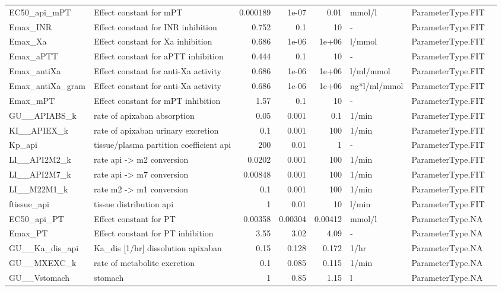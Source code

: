 \begin{tabular}{llrrrlll}
EC50\_api\_mPT & Effect constant for mPT & 0.000189 & 1e-07 & 0.01 & mmol/l & ParameterType.FIT &  \\
Emax\_INR & Effect constant for INR inhibition & 0.752 & 0.1 & 10 & - & ParameterType.FIT &  \\
Emax\_Xa & Effect constant for Xa inhibition & 0.686 & 1e-06 & 1e+06 & l/mmol & ParameterType.FIT &  \\
Emax\_aPTT & Effect constant for aPTT inhibition & 0.444 & 0.1 & 10 & - & ParameterType.FIT &  \\
Emax\_antiXa & Effect constant for anti-Xa activity & 0.686 & 1e-06 & 1e+06 & l/ml/mmol & ParameterType.FIT &  \\
Emax\_antiXa\_gram & Effect constant for anti-Xa activity & 0.686 & 1e-06 & 1e+06 & ng*l/ml/mmol & ParameterType.FIT &  \\
Emax\_mPT & Effect constant for mPT inhibition & 1.57 & 0.1 & 10 & - & ParameterType.FIT &  \\
GU\_\_APIABS\_k & rate of apixaban absorption & 0.05 & 0.001 & 0.1 & 1/min & ParameterType.FIT &  \\
KI\_\_APIEX\_k & rate of apixaban urinary excretion & 0.1 & 0.001 & 100 & 1/min & ParameterType.FIT &  \\
Kp\_api & tissue/plasma partition coefficient api & 200 & 0.01 & 1 & - & ParameterType.FIT &  \\
LI\_\_API2M2\_k & rate api -> m2 conversion & 0.0202 & 0.001 & 100 & 1/min & ParameterType.FIT &  \\
LI\_\_API2M7\_k & rate api -> m7 conversion & 0.00848 & 0.001 & 100 & 1/min & ParameterType.FIT &  \\
LI\_\_M22M1\_k & rate m2 -> m1 conversion & 0.1 & 0.001 & 100 & 1/min & ParameterType.FIT &  \\
ftissue\_api & tissue distribution api & 1 & 0.01 & 10 & l/min & ParameterType.FIT &  \\
EC50\_api\_PT & Effect constant for PT & 0.00358 & 0.00304 & 0.00412 & mmol/l & ParameterType.NA &  \\
Emax\_PT & Effect constant for PT inhibition & 3.55 & 3.02 & 4.09 & - & ParameterType.NA &  \\
GU\_\_Ka\_dis\_api & Ka\_dis [1/hr] dissolution apixaban & 0.15 & 0.128 & 0.172 & 1/hr & ParameterType.NA &  \\
GU\_\_MXEXC\_k & rate of metabolite excretion & 0.1 & 0.085 & 0.115 & 1/min & ParameterType.NA &  \\
GU\_\_Vstomach & stomach & 1 & 0.85 & 1.15 & l & ParameterType.NA &  \\

\end{tabular}
